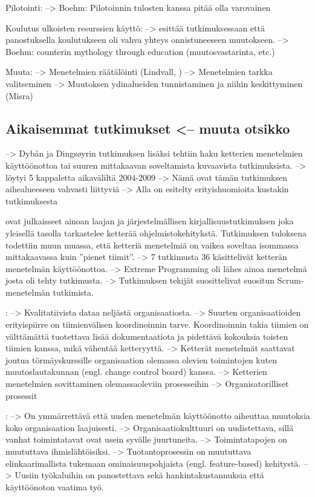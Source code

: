 Pilotointi:
--> Boehm: Pilotoinnin tulosten kanssa pitää olla varovainen

Koulutus ulkoisten resurssien käyttö:
-->  esittää tutkimuksessaan että panostuksella
koulutukseen oli vahva yhteys onnistuneeseen muutokseen.
--> Boehm: counterin mythology through education (muutosvastarinta, etc.)

Muuta:
--> Menetelmien räätälöinti (Lindvall, )
--> Menetelmien tarkka valitseminen
--> Muutoksen ydinalueiden tunnistaminen ja niihin keskittyminen (Misra)

\subsection{Aikaisemmat tutkimukset <-- muuta otsikko}

--> Dybån ja Dingsøyrin tutkimuksen lisäksi tehtiin haku ketterien menetelmien
käyttöönottoa tai suuren mittakaavan soveltamista kuvaavista tutkimuksista.
--> löytyi 5 kappaletta aikaväliltä 2004-2009
--> Nämä ovat tämän tutkimuksen aihealueeseen vahvasti liittyviä
--> Alla on esitelty erityishuomioita kustakin tutkimuksesta

 ovat julkaisseet ainoan laajan ja järjestelmällisen
kirjallisuustutkimuksen joka yleisellä tasolla tarkastelee ketterää
ohjelmistokehitykstä. Tutkimuksen tuloksena todettiin muun muassa, että ketteriä
menetelmiä on vaikea soveltaa isommassa mittakaavassa kuin ''pienet tiimit''.
--> 7 tutkimusta 36 käsittelivät ketterän menetelmän käyttöönottoa.
--> Extreme Programming oli lähes ainoa menetelmä josta oli tehty tutkimusta.
--> Tutkimuksen tekijät suosittelivat suositun Scrum-menetelmän tutkimista.

:
--> Kvalitatiivista dataa neljästä organisaatiosta. \newline
--> Suurten organisaatioiden erityispiirre on tiimienvälisen koordinoinnin
tarve. Koordinoinnin takia tiimien on välttämättä tuotettava lisää
dokumentaatiota ja pidettävä kokouksia toisten tiimien kanssa, mikä vähentää
ketteryyttä. \newline
--> Ketterät menetelmät saattavat joutua törmäyskurssille organisaation olemassa
olevien toimintojen kuten muutoslautakunnan (engl. change control board) kanssa. \newline
--> Ketterien menetelmien sovittaminen olemassaoleviin prosesseihin
--> Organisatorilliset prosessit

:
--> On ymmärrettävä että uuden menetelmän käyttöönotto aiheuttaa muutoksia koko
organisaation laajuisesti. \newline
--> Organisaatiokulttuuri on uudistettava, sillä vanhat toimintatavat ovat usein
syvälle juurtuneita. \newline
--> Toimintatapojen on muututtava ihmislähtöisiksi. \newline
--> Tuotantoprosessin on muututtava elinkaarimallista tukemaan
ominaisuuspohjaista (engl. feature-based) kehitystä. \newline
--> Uusiin työkaluihin on panostettava sekä hankintakustannuksia että
käyttöönoton vaatima työ.

